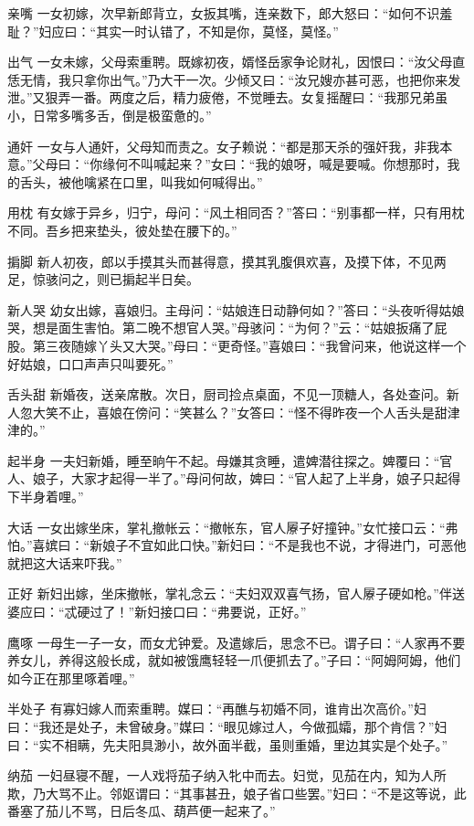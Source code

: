\documentclass[12pt,UTF8]{ctexbook}
\begin{document}
亲嘴
一女初嫁，次早新郎背立，女扳其嘴，连亲数下，郎大怒曰：“如何不识羞耻？”妇应曰：“其实一时认错了，不知是你，莫怪，莫怪。”

出气
一女未嫁，父母索重聘。既嫁初夜，婿怪岳家争论财礼，因恨曰：“汝父母直恁无情，我只拿你出气。”乃大干一次。少倾又曰：“汝兄嫂亦甚可恶，也把你来发泄。”又狠弄一番。两度之后，精力疲倦，不觉睡去。女复摇醒曰：“我那兄弟虽小，日常多嘴多舌，倒是极蛮惫的。”

通奸
一女与人通奸，父母知而责之。女子赖说：“都是那天杀的强奸我，非我本意。”父母曰：“你缘何不叫喊起来？”女曰：“我的娘呀，喊是要喊。你想那时，我的舌头，被他噙紧在口里，叫我如何喊得出。”

用枕
有女嫁于异乡，归宁，母问：“风土相同否？”答曰：“别事都一样，只有用枕不同。吾乡把来垫头，彼处垫在腰下的。”

掮脚
新人初夜，郎以手摸其头而甚得意，摸其乳腹俱欢喜，及摸下体，不见两足，惊骇问之，则已掮起半日矣。

新人哭
幼女出嫁，喜娘归。主母问：“姑娘连日动静何如？”答曰：“头夜听得姑娘哭，想是面生害怕。第二晚不想官人哭。”母骇问：“为何？”云：“姑娘扳痛了屁股。第三夜随嫁丫头又大哭。”母曰：“更奇怪。”喜娘曰：“我曾问来，他说这样一个好姑娘，口口声声只叫要死。”

舌头甜
新婚夜，送亲席散。次日，厨司捡点桌面，不见一顶糖人，各处查问。新人忽大笑不止，喜娘在傍问：“笑甚么？”女答曰：“怪不得昨夜一个人舌头是甜津津的。”

起半身
一夫妇新婚，睡至晌午不起。母嫌其贪睡，遣婢潜往探之。婢覆曰：“官人、娘子，大家才起得一半了。”母问何故，婢曰：“官人起了上半身，娘子只起得下半身着哩。”

大话
一女出嫁坐床，掌礼撤帐云：“撤帐东，官人屪子好撞钟。”女忙接口云：“弗怕。”喜嫔曰：“新娘子不宜如此口快。”新妇曰：“不是我也不说，才得进门，可恶他就把这大话来吓我。”

正好
新妇出嫁，坐床撤帐，掌礼念云：“夫妇双双喜气扬，官人屪子硬如枪。”伴送婆应曰：“忒硬过了！”新妇接口曰：“弗要说，正好。”

鹰啄
一母生一子一女，而女尤钟爱。及遣嫁后，思念不已。谓子曰：“人家再不要养女儿，养得这般长成，就如被饿鹰轻轻一爪便抓去了。”子曰：“阿姆阿姆，他们如今正在那里啄着哩。”

半处子
有寡妇嫁人而索重聘。媒曰：“再醮与初婚不同，谁肯出次高价。”妇曰：“我还是处子，未曾破身。”媒曰：“眼见嫁过人，今做孤孀，那个肯信？”妇曰：“实不相瞒，先夫阳具渺小，故外面半截，虽则重婚，里边其实是个处子。”

纳茄
一妇昼寝不醒，一人戏将茄子纳入牝中而去。妇觉，见茄在内，知为人所欺，乃大骂不止。邻妪谓曰：“其事甚丑，娘子省口些罢。”妇曰：“不是这等说，此番塞了茄儿不骂，日后冬瓜、葫芦便一起来了。”
\end{document}
